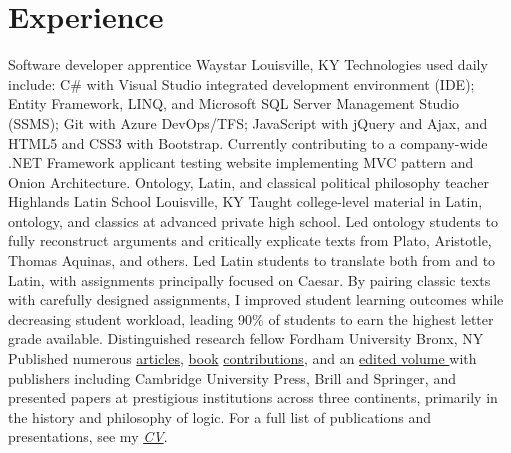 \section{Experience}
{Software developer apprentice}
{Waystar}
{Louisville, KY}
{}
{Technologies used daily include: 
	C\# with Visual Studio integrated development environment (IDE); 
	Entity Framework, LINQ, and Microsoft SQL Server Management Studio (SSMS); 
	Git with Azure DevOps/TFS;  
	JavaScript with jQuery and Ajax, 
	and HTML5 and CSS3 with Bootstrap. 
	Currently contributing to a company-wide .NET Framework applicant testing website implementing MVC pattern and Onion Architecture.}
{Ontology, Latin, and classical political philosophy teacher}
{Highlands Latin School}
{Louisville, KY}
{}
{Taught college-level material in Latin, ontology, and classics at advanced private high school. 
	Led ontology students to fully reconstruct arguments 
	and critically explicate texts from Plato, Aristotle, Thomas Aquinas, and others. 
	Led Latin students to translate both from and to Latin, 
	with assignments principally focused on Caesar. 
	By pairing classic texts with carefully designed assignments, 
	I improved student learning outcomes 
	while decreasing student workload, 
	leading 90\% of students to earn the highest letter grade available.}
{Distinguished research fellow}
{Fordham University}
{Bronx, NY}
{}
{Published numerous \href{https://fordham.academia.edu/jacobarchambault}{articles}, \href{https://www.collegepublications.co.uk/dialogues/?00005}{book} \href{https://www.cambridgescholars.com/hylomorphism-and-mereology}{contributions}, and an \href{https://brill.com/view/journals/viv/56/3-4/viv.56.issue-3-4.xml?language=en}{edited volume }
	with publishers including Cambridge University Press, Brill and Springer, 
	and presented papers at prestigious institutions across three continents, 
	primarily in the history and philosophy of logic. 
	For a full list of publications and presentations, see my 
	\href{https://jacobarchambault.com/curriculum-vitae}{\emph{CV}}.}
